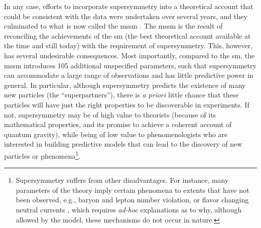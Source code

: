 \documentclass[smallextended]{svjour3}
\begin{document}
In any case, efforts to incorporate supersymmetry into a theoretical account that could be consistent with the data were undertaken over several years, and they culminated to what is now called the \gls{mssm} \citep{Fayet1976cr,Dimopoulos1981}. The \gls{mssm} is the result of reconciling the achievements of the \gls{sm} (the best theoretical account available at the time and still today) with the requirement of supersymmetry. This, however, has several undesirable consequences. Most importantly, compared to the \gls{sm}, the \gls{mssm} introduces 105 additional unspecified parameters, such that supersymmetry can accommodate a large range of observations and has little predictive power in general. In particular, although supersymmetry predicts the existence of many new particles (the ``superpartners''), there is \textit{a priori} little chance  that these particles will have just the right properties to be discoverable in experiments. If not, supersymmetry may be of high value to theorists (because of its mathematical properties, and its promise to achieve a coherent account of quantum gravity), while being of low value to phenomenologists who are interested in building predictive models that can lead to the discovery of new particles or phenomena\footnote{Supersymmetry suffers from other disadvantages. For instance, many parameters of the theory imply certain phenomena to extents that have not been observed, e.g., baryon and lepton number violation, or flavor changing neutral currents \citep{weinberg1995the}, which requires \textit{ad-hoc} explanations as to why, although allowed by the model, these mechanisms do not occur in nature.}.
\end{document}
